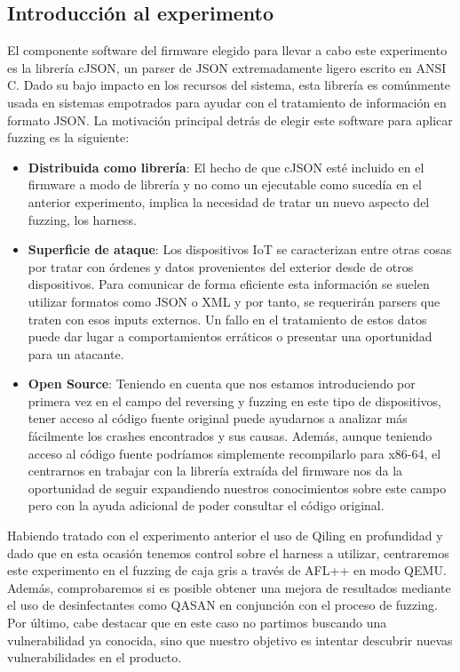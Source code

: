 \subsection{Introducción al experimento}
El componente software del firmware elegido para llevar a cabo este experimento es la librería cJSON, un parser de JSON extremadamente 
ligero escrito en ANSI C. Dado su bajo impacto en los recursos del sistema, esta librería es comúnmente usada en sistemas empotrados para
ayudar con el tratamiento de información en formato JSON. La motivación principal detrás de elegir este software para aplicar fuzzing es
la siguiente:
\begin{itemize}
    \item \textbf{Distribuida como librería}: El hecho de que cJSON esté incluido en el firmware a modo de librería y no como un ejecutable
    como sucedía en el anterior experimento, implica la necesidad de tratar un nuevo aspecto del fuzzing, los harness.
    \item \textbf{Superficie de ataque}: Los dispositivos IoT se caracterizan entre otras cosas por tratar con órdenes y datos provenientes del exterior
    desde de otros dispositivos. Para comunicar de forma eficiente esta información se suelen utilizar formatos como JSON o XML y por tanto, se 
    requerirán parsers que traten con esos inputs externos. Un fallo en el tratamiento de estos datos puede dar lugar a comportamientos erráticos o 
    presentar una oportunidad para un atacante.
    \item \textbf{Open Source}: Teniendo en cuenta que nos estamos introduciendo por primera vez en el campo del reversing y fuzzing en este tipo de 
    dispositivos, tener acceso al código fuente original puede ayudarnos a analizar más fácilmente los crashes encontrados y sus causas. Además, 
    aunque teniendo acceso al código fuente podríamos simplemente recompilarlo para x86-64, el centrarnos en trabajar con la librería extraída del firmware 
    nos da la oportunidad de seguir expandiendo nuestros conocimientos sobre este campo pero con la ayuda adicional de poder consultar el código original.
\end{itemize}

Habiendo tratado con el experimento anterior el uso de Qiling en profundidad y dado que en esta ocasión tenemos control sobre el harness a utilizar, centraremos
este experimento en el fuzzing de caja gris a través de AFL++ en modo QEMU. Además, comprobaremos si es posible obtener una mejora de resultados mediante 
el uso de desinfectantes como QASAN en conjunción con el proceso de fuzzing. Por último, cabe destacar que en este caso no partimos buscando una vulnerabilidad
ya conocida, sino que nuestro objetivo es intentar descubrir nuevas vulnerabilidades en el producto.

